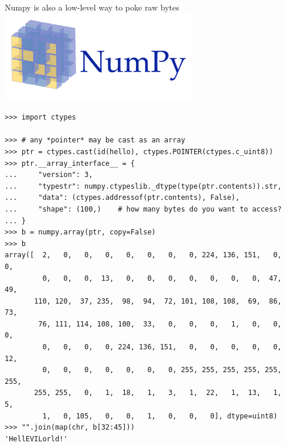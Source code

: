 \documentclass[aspectratio=169]{beamer}
\begin{document}
\begin{frame}[fragile]{Numpy is also a low-level way to poke raw bytes}
\vspace{0.5 cm}
\hfill \includegraphics[height=1.5 cm]{numpy-logo.png}

\scriptsize
\vspace{-1.7 cm}
\begin{verbatim}
>>> import ctypes

>>> # any *pointer* may be cast as an array
>>> ptr = ctypes.cast(id(hello), ctypes.POINTER(ctypes.c_uint8))
>>> ptr.__array_interface__ = {
...     "version": 3,
...     "typestr": numpy.ctypeslib._dtype(type(ptr.contents)).str,
...     "data": (ctypes.addressof(ptr.contents), False),
...     "shape": (100,)    # how many bytes do you want to access?
... }
>>> b = numpy.array(ptr, copy=False)
>>> b
array([  2,   0,   0,   0,   0,   0,   0,   0, 224, 136, 151,   0,   0,
         0,   0,   0,  13,   0,   0,   0,   0,   0,   0,   0,  47,  49,
       110, 120,  37, 235,  98,  94,  72, 101, 108, 108,  69,  86,  73,
        76, 111, 114, 108, 100,  33,   0,   0,   0,   1,   0,   0,   0,
         0,   0,   0,   0, 224, 136, 151,   0,   0,   0,   0,   0,  12,
         0,   0,   0,   0,   0,   0,   0, 255, 255, 255, 255, 255, 255,
       255, 255,   0,   1,  18,   1,   3,   1,  22,   1,  13,   1,   5,
         1,   0, 105,   0,   0,   1,   0,   0,   0], dtype=uint8)
>>> "".join(map(chr, b[32:45]))
'HellEVILorld!'
\end{verbatim}
\end{frame}
\end{document}
